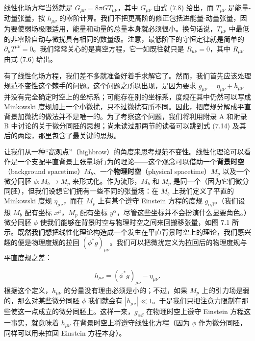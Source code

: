 线性化场方程当然就是 $G_{\mu\nu} = 8\pi GT_{\mu\nu}$，其中 $G_{\mu\nu}$ 由式 (7.8) 给出，而 $T_{\mu\nu}$ 是能量-动量张量，按 $h_{\mu\nu}$ 的零阶计算。我们不把更高阶的修正包括进能量-动量张量，因为要使弱场极限适用，能量和动量的总量本身就必须很小。换句话说，$T_{\mu\nu}$ 中最低的非零阶自动与微扰具有相同的数量级。注意，最低阶下的守恒定律就是简单的 $\partial_{\mu}T^{\mu\nu} = 0$。我们常常关心的是真空方程，它一如既往就只是 $R_{\mu\nu} = 0$，其中 $R_{\mu\nu}$ 由式 (7.6) 给出。

有了线性化场方程，我们差不多就准备好着手求解它了。然而，我们首先应该处理规范不变性这个棘手的问题。这个问题之所以出现，是因为要求 $g_{\mu\nu} = \eta_{\mu\nu} + h_{\mu\nu}$ 并没有完全确定时空上的坐标系；可能存在别的坐标系，度规在其中仍然可以写成 Minkowski 度规加上一个小微扰，只不过微扰有所不同。因此，把度规分解成平直背景加微扰的做法并不是唯一的。为了考察这个问题，我们将利用附录 A 和附录 B 中讨论的关于微分同胚的思想；尚未读过那两节的读者可以跳到式 (7.14) 及其后的两段，那里包含了最关键的思想。

让我们从一种“高观点”（highbrow）的角度来思考规范不变性。线性化理论可以看作是一个支配平直背景上张量场行为的理论——这个观念可以借助一个\textbf{背景时空}（background spacetime）$M_{b}$、一个\textbf{物理时空}（physical spacetime）$M_{p}$ 以及一个微分同胚 $\phi : M_{b} \to M_{p}$ 来形式化。作为流形，$M_{b}$ 和 $M_{p}$ 是同一个（因为它们微分同胚），但我们设想它们拥有一些不同的张量场：在 $M_{b}$ 上我们定义了平直的 Minkowski 度规 $\eta_{\mu\nu}$，而在 $M_{p}$ 上有某个遵守 Einstein 方程的度规 $g_{\alpha\beta}$。（我们设想 $M_{b}$ 配有坐标 $x^{\mu}$，$M_{p}$ 配有坐标 $y^{\alpha}$，尽管这些坐标并不会扮演什么显要角色。）微分同胚 $\phi$ 使我们能够在背景时空与物理时空之间来回搬移张量，如图 7.1 所示。既然我们想把线性化理论构造成一个发生在平直背景时空上的理论，我们感兴趣的便是物理度规的拉回 $(\phi^{*}g)_{\mu\nu}$。我们可以把微扰定义为拉回后的物理度规与平直度规之差：


\begin{equation*}
h_{\mu\nu} = (\phi^{*}g)_{\mu\nu} - \eta_{\mu\nu}.
\tag{7.10}
\end{equation*}
根据这个定义，$h_{\mu\nu}$ 的分量没有理由必须是小的；不过，如果 $M_{p}$ 上的引力场是弱的，那么对某些微分同胚 $\phi$ 我们就会有 $|h_{\mu\nu}| \ll 1$。于是我们只把注意力限制在那些使这一点成立的微分同胚上。这样一来，$g_{\alpha\beta}$ 在物理时空上遵守 Einstein 方程这一事实，就意味着 $h_{\mu\nu}$ 在背景时空上将遵守线性化方程（因为 $\phi$ 作为微分同胚，同样可以用来拉回 Einstein 方程本身）。

